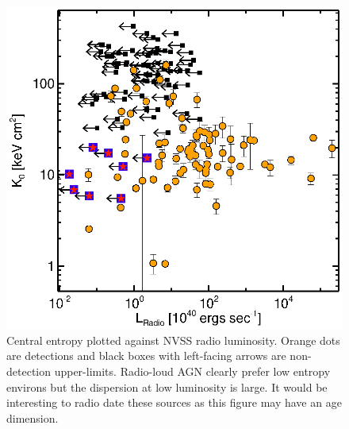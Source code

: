 \documentclass[11pt]{article}
\begin{document}
\begin{figure}[t]
\begin{minipage}[t]{0.5\linewidth}
        \includegraphics*[width=\textwidth, trim=28mm 8mm 30mm 10mm, clip]{k0rad}
        \caption{\small Central entropy plotted against NVSS radio
	luminosity. Orange dots are detections and black boxes with left-facing
	arrows are non-detection upper-limits. Radio-loud AGN clearly
	prefer low entropy environs but the dispersion at low luminosity is
	large. It would be interesting to radio date these sources as this
	figure may have an age dimension.}
        \label{fig:rad}
    \end{minipage}
\end{figure}
\end{document}
